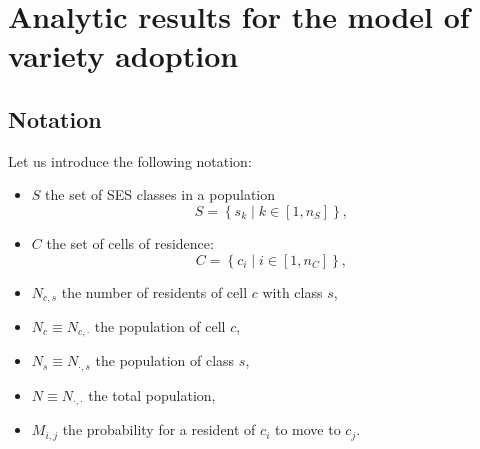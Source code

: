 \documentclass[../thesis.tex]{subfiles}
\begin{document}
\chapter{Analytic results for the model of variety adoption}
\label{ch:appendix_ses_model}

\section*{Notation}
Let us introduce the following notation:
\begin{itemize}
    \item $S$ the set of \ac{SES} classes in a population
        \begin{equation}
            S = \left\{ s_k \mid k \in [1, n_S] \right\},
        \end{equation}
    \item $C$ the set of cells of residence:
        \begin{equation}
             C = \left\{ c_i \mid i \in [1, n_C] \right\},
        \end{equation}
    \item $N_{c, s}$ the number of residents of cell $c$ with class $s$,
    \item $N_{c} \equiv N_{c, \cdot}$ the population of cell $c$,
    \item $N_{s} \equiv N_{\cdot, s}$ the population of class $s$,
    \item $N \equiv N_{\cdot, \cdot}$ the total population,
    \item $M_{i, j}$ the probability for a resident of $c_i$ to move to $c_j$.
\end{itemize}
\end{document}

